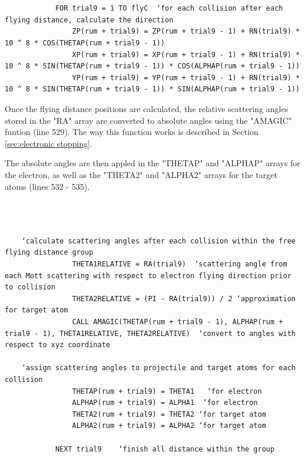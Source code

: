 \documentclass[10pt, reqno]{exam}
\begin{document}
\begin{verbatim}
    
    
            FOR trial9 = 1 TO flyC  ‘for each collision after each flying distance, calculate the direction 
                ZP(rum + trial9) = ZP(rum + trial9 - 1) + RN(trial9) * 10 ^ 8 * COS(THETAP(rum + trial9 - 1))
                XP(rum + trial9) = XP(rum + trial9 - 1) + RN(trial9) * 10 ^ 8 * SIN(THETAP(rum + trial9 - 1)) * COS(ALPHAP(rum + trial9 - 1))
                YP(rum + trial9) = YP(rum + trial9 - 1) + RN(trial9) * 10 ^ 8 * SIN(THETAP(rum + trial9 - 1)) * SIN(ALPHAP(rum + trial9 - 1))
\end{verbatim}

Once the flying distance positions are calculated, the relative scattering angles stored in the "RA" array are converted to absolute angles using the "AMAGIC" funtion (line 529). The way this function works is described in Section \ref{sec:electronic stopping}. \par

The absolute angles are then appled in the "THETAP" and "ALPHAP" arrays for the electron, as well as the "THETA2" and "ALPHA2" arrays for the target atoms (lines 532 - 535). \par

\begin{verbatim}
    
    
    
    ‘calculate scattering angles after each collision within the free flying distance group
                THETA1RELATIVE = RA(trial9)  ‘scattering angle from each Mott scattering with respect to electron flying direction prior to collision 
                THETA2RELATIVE = (PI - RA(trial9)) / 2 ‘approximation for target atom
                CALL AMAGIC(THETAP(rum + trial9 - 1), ALPHAP(rum + trial9 - 1), THETA1RELATIVE, THETA2RELATIVE)  ‘convert to angles with respect to xyz coordinate
    
    ‘assign scattering angles to projectile and target atoms for each collision
                THETAP(rum + trial9) = THETA1   ‘for electron
                ALPHAP(rum + trial9) = ALPHA1  ‘for electron
                THETA2(rum + trial9) = THETA2 ‘for target atom
                ALPHA2(rum + trial9) = ALPHA2 ‘for target atom
    
            NEXT trial9    ‘finish all distance within the group
\end{verbatim}
\end{document}
